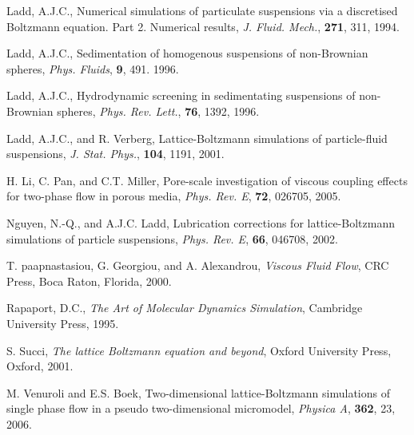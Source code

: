\begin{thebibliography}{99}
Ladd, A.J.C., Numerical simulations of particulate suspensions
via a discretised Boltzmann equation. Part 2. Numerical results,
\textit{J. Fluid. Mech.}, \textbf{271}, 311, 1994.

Ladd, A.J.C., Sedimentation of homogenous suspensions of non-Brownian
spheres,
\textit{Phys. Fluids}, \textbf{9}, 491. 1996.

Ladd, A.J.C., Hydrodynamic screening in sedimentating suspensions
of non-Brownian spheres,
\textit{Phys. Rev. Lett.}, \textbf{76}, 1392, 1996.

Ladd, A.J.C., and R. Verberg,
Lattice-Boltzmann simulations of particle-fluid suspensions,
\textit{J. Stat. Phys.}, \textbf{104}, 1191, 2001.

H. Li, C. Pan, and C.T. Miller,
Pore-scale investigation of viscous coupling effects for two-phase
flow in porous media,
\textit{Phys. Rev. E}, \textbf{72}, 026705, 2005.

Nguyen, N.-Q., and A.J.C. Ladd, Lubrication corrections for
lattice-Boltzmann simulations of particle suspensions,
\textit{Phys. Rev. E}, \textbf{66}, 046708, 2002.

T. paapnastasiou, G. Georgiou, and A. Alexandrou,
\textit{Viscous Fluid Flow},
CRC Press, Boca Raton, Florida, 2000.

Rapaport, D.C., \textit{The Art of Molecular Dynamics Simulation},
Cambridge University Press, 1995.

S. Succi, \textit{The lattice Boltzmann equation and beyond},
Oxford University Press, Oxford, 2001.

M. Venuroli and E.S. Boek,
Two-dimensional lattice-Boltzmann simulations of single phase
flow in a pseudo two-dimensional micromodel,
\textit{Physica A}, \textbf{362}, 23, 2006.


\end{thebibliography}




